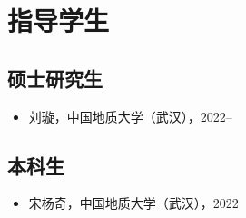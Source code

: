 \section{指导学生}

\subsection{硕士研究生}
\begin{itemize}
\item 刘璇，中国地质大学（武汉），2022--
\end{itemize}

\subsection{本科生}
\begin{itemize}
\item 宋杨奇，中国地质大学（武汉），2022
\end{itemize}
